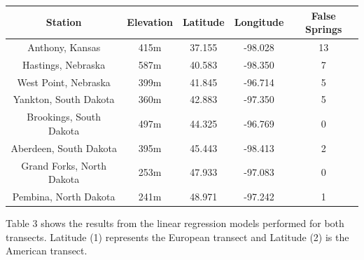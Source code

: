 \documentclass{article}\usepackage[]{graphicx}\usepackage[]{color}
\begin{document}
\begin{center}
 \label{tab:title2} 
\begin{tabular}{c c c c c}
\hline
Station & Elevation & Latitude & Longitude & False Springs \\
\hline
Anthony, Kansas & 415m & 37.155 & -98.028 & 13 \\
Hastings, Nebraska & 587m & 40.583 & -98.350  & 7 \\
West Point, Nebraska & 399m & 41.845 & -96.714 & 5 \\
Yankton, South Dakota & 360m & 42.883 & -97.350 & 5 \\
Brookings, South Dakota & 497m & 44.325 & -96.769 & 0 \\
Aberdeen, South Dakota & 395m & 45.443 & -98.413 & 2 \\
Grand Forks, North Dakota & 253m & 47.933 & -97.083 & 0 \\
Pembina, North Dakota & 241m & 48.971 & -97.242 & 1 \\
\hline
\end{tabular}
\end{center}

Table 3 shows the results from the linear regression models performed for both transects. Latitude (1) represents the European transect and Latitude (2) is the American transect. 
\end{document}
